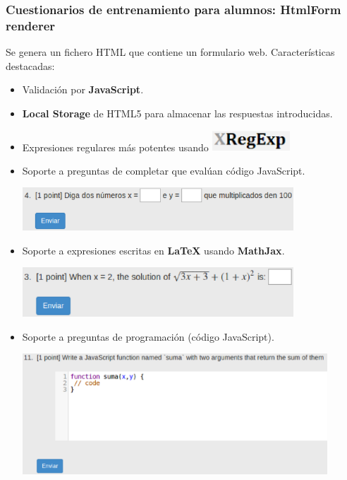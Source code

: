 \documentclass{beamer}
\begin{document}
\begin{frame}[allowframebreaks]
\frametitle{Cuestionarios de entrenamiento para alumnos: HtmlForm renderer}
  Se genera un fichero HTML que contiene un formulario web. Características destacadas:
  \begin{itemize}
    \item Validación por {\bfseries JavaScript}.
    \item {\bfseries Local Storage} de HTML5 para almacenar las respuestas introducidas.
    \item Expresiones regulares más potentes usando \includegraphics[width=0.23\textwidth]{img/xregexp.eps}
    \framebreak
    
    \item Soporte a preguntas de completar que evalúan código JavaScript.
    \bigskip
    \begin{center}
      \includegraphics[width=0.8\textwidth]{img/fi_p.eps}
    \end{center}
    \bigskip
    
    \item Soporte a expresiones escritas en {\bfseries LaTeX} usando {\bfseries MathJax}.
    \bigskip
    \begin{center}
      \includegraphics[width=0.8\textwidth]{img/latex.eps}
    \end{center}
    \framebreak
    
    \item Soporte a preguntas de programación (código JavaScript).
    \bigskip
    \begin{center}
      \includegraphics[width=0.9\textwidth]{img/programming.eps}
    \end{center}
    \framebreak
    

\end{itemize}
\end{frame}
\end{document}
